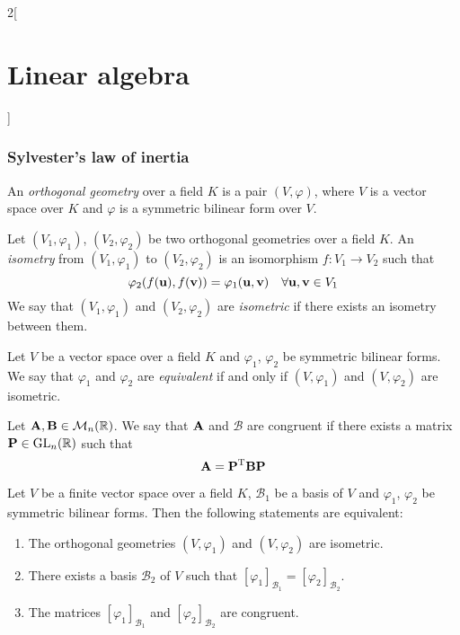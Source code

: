 \documentclass[../../../main.tex]{subfiles}
\begin{document}
\begin{multicols}{2}[\section{Linear algebra}]
  \subsubsection{Sylvester's law of inertia}
  \begin{definition}
    An \emph{orthogonal geometry} over a field $K$ is a pair $(V,\varphi)$, where $V$ is a vector space over $K$ and $\varphi$ is a symmetric bilinear form over $V$.
  \end{definition}
  \begin{definition}\label{LA_isometry}
    Let $(V_1,\varphi_1)$, $(V_2,\varphi_2)$ be two orthogonal geometries over a field $K$. An \emph{isometry} from $(V_1,\varphi_1)$ to $(V_2,\varphi_2)$ is an isomorphism $f:V_1\rightarrow V_2$ such that $$\varphi_2(f(\boldsymbol{\mathrm{u}}),f(\boldsymbol{\mathrm{v}}))=\varphi_1(\boldsymbol{\mathrm{u}},\boldsymbol{\mathrm{v}})\quad\forall\boldsymbol{\mathrm{u}},\boldsymbol{\mathrm{v}}\in V_1$$ We say that $(V_1,\varphi_1)$ and $(V_2,\varphi_2)$ are \emph{isometric} if there exists an isometry between them.
  \end{definition}
  \begin{definition}
    Let $V$ be a vector space over a field $K$ and $\varphi_1$, $\varphi_2$ be symmetric bilinear forms. We say that $\varphi_1$ and $\varphi_2$ are \emph{equivalent} if and only if $(V,\varphi_1)$ and $(V,\varphi_2)$ are isometric.
  \end{definition}
  \begin{definition}
    Let $\boldsymbol{\mathrm{A}},\boldsymbol{\mathrm{B}}\in\mathcal{M}_n(\mathbb{R})$. We say that $\boldsymbol{\mathrm{A}}$ and $\mathcal{B}$ are congruent if there exists a matrix $\boldsymbol{\mathrm{P}}\in\mathrm{GL}_n(\mathbb{R})$ such that $$\boldsymbol{\mathrm{A}}=\vb{P}^{\mathrm{T}}\boldsymbol{\mathrm{B}}\boldsymbol{\mathrm{P}}$$
  \end{definition}
  \begin{proposition}
    Let $V$ be a finite vector space over a field $K$, $\mathcal{B}_1$ be a basis of $V$ and $\varphi_1$, $\varphi_2$ be symmetric bilinear forms. Then the following statements are equivalent:
    \begin{enumerate}
      \item The orthogonal geometries $(V,\varphi_1)$ and $(V,\varphi_2)$ are isometric.
      \item There exists a basis $\mathcal{B}_2$ of $V$ such that $[\varphi_1]_{\mathcal{B}_1}=[\varphi_2]_{\mathcal{B}_2}$.
      \item The matrices $[\varphi_1]_{\mathcal{B}_1}$ and $[\varphi_2]_{\mathcal{B}_2}$ are congruent.
    \end{enumerate}
  \end{proposition}
  \begin{theorem}

\end{theorem}
\end{multicols}
\end{document}

